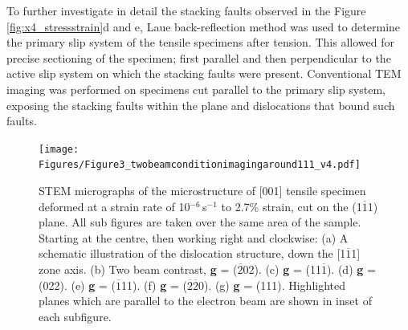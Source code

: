 \documentclass[a4paper,12pt,times,numbered,print,index]{Classes/PhDThesisPSnPDF}
\begin{document}
To further investigate in detail the stacking faults observed in the Figure \ref{fig:x4_stressstrain}d and e, Laue back-reflection method was used to determine the primary slip system of the tensile specimens after tension. This allowed for precise sectioning of the specimen; first parallel and then perpendicular to the active slip system on which the stacking faults were present. Conventional TEM imaging was performed on specimens cut parallel to the primary slip system, exposing the stacking faults within the plane and dislocations that bound such faults.\\
\begin{figure}
\texttt{[image: Figures/Figure3\_twobeamconditionimagingaround111\_v4.pdf]}
\caption{STEM micrographs of the microstructure of [001] tensile specimen deformed at a strain rate of 10$^{-6}$\,s$^{-1}$ to 2.7\% strain, cut on the (1$\overline{1}$1) plane. All sub figures are taken over the same area of the sample. Starting at the centre, then working right and clockwise: (a) A schematic illustration of the dislocation structure, down the [1$\overline{1}$1] zone axis. (b) Two beam contrast, \textbf{g} = ($\overline{2}$02). (c) \textbf{g} = (11$\overline{1}$). (d) \textbf{g} = (022). (e) \textbf{g} = ($\overline{1}$11). (f) \textbf{g} = ($\overline{2}\overline{2}$0). (g) \textbf{g} = (111). Highlighted planes which are parallel to the electron beam are shown in inset of each subfigure.}
\label{fig:SF}
\end{figure}
\end{document}
